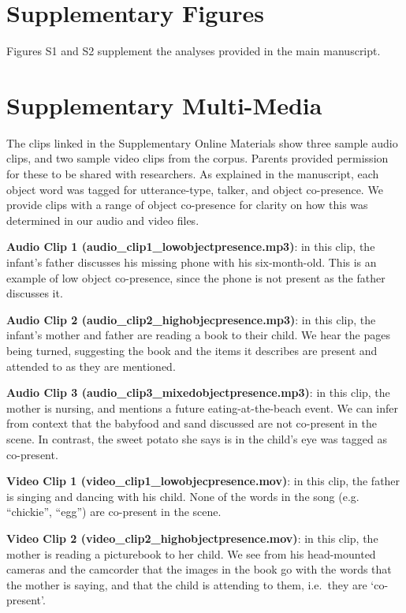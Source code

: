 \documentclass[]{article}
\begin{document}
\section{Supplementary Figures}\label{supplementary-figures}

Figures S1 and S2 supplement the analyses provided in the main
manuscript.

\section{Supplementary Multi-Media}\label{supplementary-multi-media}

The clips linked in the Supplementary Online Materials show three sample
audio clips, and two sample video clips from the corpus. Parents
provided permission for these to be shared with researchers. As
explained in the manuscript, each object word was tagged for
utterance-type, talker, and object co-presence. We provide clips with a
range of object co-presence for clarity on how this was determined in
our audio and video files.

\textbf{Audio Clip 1 (audio\_clip1\_lowobjectpresence.mp3)}: in this
clip, the infant's father discusses his missing phone with his
six-month-old. This is an example of low object co-presence, since the
phone is not present as the father discusses it.

\textbf{Audio Clip 2 (audio\_clip2\_highobjecpresence.mp3)}: in this
clip, the infant's mother and father are reading a book to their child.
We hear the pages being turned, suggesting the book and the items it
describes are present and attended to as they are mentioned.

\textbf{Audio Clip 3 (audio\_clip3\_mixedobjectpresence.mp3)}: in this
clip, the mother is nursing, and mentions a future eating-at-the-beach
event. We can infer from context that the babyfood and sand discussed
are not co-present in the scene. In contrast, the sweet potato she says
is in the child's eye was tagged as co-present.

\textbf{Video Clip 1 (video\_clip1\_lowobjecpresence.mov)}: in this
clip, the father is singing and dancing with his child. None of the
words in the song (e.g. ``chickie'', ``egg'') are co-present in the
scene.

\textbf{Video Clip 2 (video\_clip2\_highobjectpresence.mov)}: in this
clip, the mother is reading a picturebook to her child. We see from his
head-mounted cameras and the camcorder that the images in the book go
with the words that the mother is saying, and that the child is
attending to them, i.e.~they are `co-present'.
\end{document}
